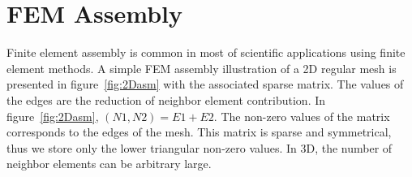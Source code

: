 \documentclass{IOS-Book-Article}
\begin{document}
\section{FEM Assembly}

Finite element assembly is common in most of scientific applications using finite element methods.
A simple FEM assembly illustration of a 2D regular mesh is presented in figure~\ref{fig:2Dasm} with the associated sparse matrix.
The values of the edges are the reduction of neighbor element contribution. In figure~\ref{fig:2Dasm}, $(N1,N2) = E1 + E2$.
The non-zero values of the matrix corresponds to the edges of the mesh. This matrix is sparse and symmetrical, thus we store only the lower triangular non-zero values.
In 3D, the number of neighbor elements can be arbitrary large.
\end{document}
